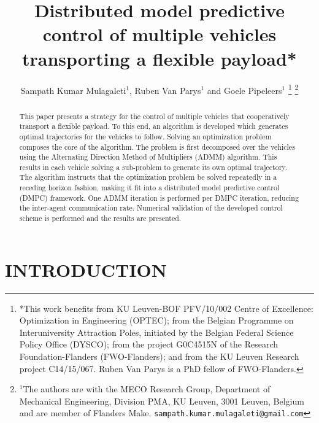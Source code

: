 \documentclass[letterpaper, 10 pt, conference]{ieeeconf}
\title{\LARGE \bf
Distributed model predictive control of multiple
vehicles transporting a flexible payload*
}
\author{Sampath Kumar Mulagaleti$^{1}$, Ruben Van Parys$^{1}$ and Goele Pipeleers$^{1}$%
\thanks{*This work benefits from KU Leuven-BOF PFV/10/002 Centre of Excellence: Optimization in Engineering (OPTEC); from the Belgian Programme on Interuniversity Attraction Poles, initiated by the Belgian Federal Science Policy Office (DYSCO); from the project G0C4515N of the Research Foundation-Flanders (FWO-Flanders); and from the KU Leuven Research project C14/15/067. Ruben Van Parys is a PhD fellow of FWO-Flanders. }%
\thanks{$^{1}$The authors are with the MECO Research Group, Department of Mechanical Engineering, Division PMA, KU Leuven, 3001 Leuven, Belgium and are member of Flanders Make. \texttt{sampath.kumar.mulagaleti@gmail.com}}
}
\begin{document}
\maketitle
\thispagestyle{empty}
\pagestyle{empty}


\begin{abstract}
This paper presents a strategy for the control of multiple vehicles that cooperatively transport a flexible payload. To this end, an algorithm is developed which generates optimal trajectories for the vehicles to follow. Solving an optimization problem composes the core of the algorithm. The problem is first decomposed over the vehicles using the Alternating Direction Method of Multipliers (ADMM) algorithm. This results in each vehicle solving a sub-problem to generate its own optimal trajectory. The algorithm instructs that the optimization problem be solved repeatedly in a receding horizon fashion, making it fit into a distributed model predictive control (DMPC) framework. One ADMM iteration is performed per DMPC iteration, reducing the inter-agent communication rate. Numerical validation of the developed control scheme is performed and the results are presented.
\end{abstract}


\section{INTRODUCTION}
\end{document}
